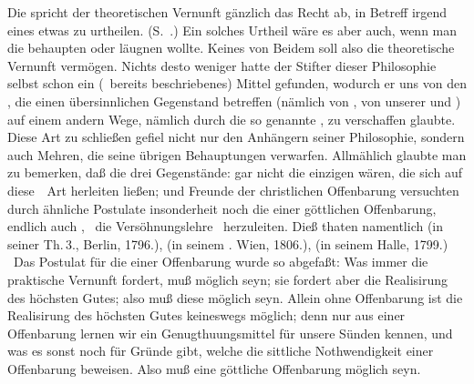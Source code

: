 Die  spricht der theoretischen Vernunft gänzlich das Recht ab, in Betreff irgend eines  etwas zu urtheilen. (S.\ .) Ein solches Urtheil wäre es aber auch, wenn man die  behaupten oder läugnen wollte. Keines von Beidem soll also die theoretische Vernunft vermögen. Nichts desto weniger hatte der Stifter dieser Philosophie selbst schon ein (\aaO\ bereits beschriebenes) Mittel gefunden, wodurch er uns von den , die einen übersinnlichen Gegenstand betreffen (nämlich von , von unserer  und ) auf einem andern Wege, nämlich durch die so genannte ,  zu verschaffen glaubte. Diese Art zu schließen gefiel nicht nur den Anhängern seiner Philosophie, sondern auch Mehren, die seine übrigen Behauptungen verwarfen. Allmählich glaubte man zu bemerken, daß die drei Gegenstände:  gar nicht die einzigen wären, die sich auf diese~\ Art herleiten ließen; und Freunde der christlichen Offenbarung versuchten durch ähnliche Postulate insonderheit noch die  einer göttlichen Offenbarung, endlich auch , \zB\ die Versöhnungslehre \ua\ herzuleiten. Dieß thaten namentlich  (in seiner  Th.\,3., Berlin, 1796.),  (in seinem . Wien, 1806.),  (in seinem  Halle, 1799.) \umA\  
Das Postulat für die  einer Offenbarung wurde so abgefaßt: Was immer die praktische Vernunft fordert, muß möglich seyn; sie fordert aber die Realisirung des höchsten Gutes; also muß diese möglich seyn. Allein ohne Offenbarung ist die Realisirung des höchsten Gutes keineswegs möglich; denn nur aus einer Offenbarung lernen wir ein Genugthuungsmittel für unsere Sünden kennen, und was es sonst noch für Gründe gibt, welche die sittliche Nothwendigkeit einer Offenbarung beweisen. Also muß eine göttliche Offenbarung möglich seyn.



